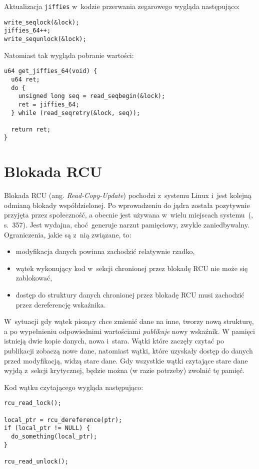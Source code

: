 \documentclass[shortabstract]{iithesis}
\theoremstyle{definition} \newtheorem*{definition}{Definicja}
\theoremstyle{definition} \newtheorem*{example}{Przykład}
\theoremstyle{definition} \newtheorem*{remark}{Uwaga}
\begin{document}
Aktualizacja \texttt{jiffies} w~kodzie przerwania zegarowego wygląda następująco:
\begin{lstlisting}
write_seqlock(&lock);
jiffies_64++;
write_sequnlock(&lock);
\end{lstlisting}

Natomiast tak wygląda pobranie wartości:
\begin{lstlisting}
u64 get_jiffies_64(void) {
  u64 ret;
  do {
    unsigned long seq = read_seqbegin(&lock);
    ret = jiffies_64;
  } while (read_seqretry(&lock, seq));

  return ret;
}
\end{lstlisting}

\section{Blokada RCU}

Blokada RCU (ang. \textit{Read-Copy-Update}) pochodzi z~systemu Linux i~jest kolejną
odmianą blokady współdzielonej. Po wprowadzeniu do jądra została pozytywnie przyjęta przez
społeczność, a obecnie jest używana w~wielu miejscach systemu~(\cite{bib:lka}, s.~357).
Jest wydajna, choć generuje narzut pamięciowy, zwykle zaniedbywalny. Ograniczenia, jakie są z~nią związane, to:
\begin{itemize}
\item modyfikacja danych powinna zachodzić relatywnie rzadko,
\item wątek wykonujący kod w~sekcji chronionej przez blokadę RCU nie może się zablokować,
\item dostęp do struktury danych chronionej przez blokadę RCU musi zachodzić przez dereferencję wskaźnika.
\end{itemize}

W~sytuacji gdy wątek piszący chce zmienić dane na inne, tworzy nową strukturę, a po wypełnieniu odpowiednimi
wartościami \textit{publikuje} nowy wskaźnik. W pamięci istnieją dwie kopie danych, nowa i~stara.
Wątki które zaczęły czytać po publikacji zobaczą nowe dane, natomiast wątki, które uzyskały dostęp do danych przed
modyfikacją, widzą stare dane. Gdy wszystkie wątki czytające stare dane wyjdą z~sekcji krytycznej, będzie
można (w razie potrzeby) zwolnić tę pamięć.

Kod wątku czytającego wygląda następująco:
\begin{lstlisting}
rcu_read_lock();

local_ptr = rcu_dereference(ptr);
if (local_ptr != NULL) {
  do_something(local_ptr);
}

rcu_read_unlock();
\end{lstlisting}
\end{document}
